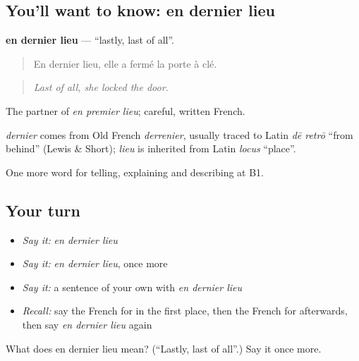 \subsection*{You'll want to know: en dernier lieu}
\textbf{en dernier lieu} — \textquotedblleft{}lastly, last of all\textquotedblright{}.

\begin{quote}
En dernier lieu, elle a fermé la porte à clé.
\end{quote}

\begin{quote}
\emph{Last of all, she locked the door.}
\end{quote}

The partner of \emph{en premier lieu}; careful, written French.

\begin{cousinweb}
\emph{dernier} comes from Old French \emph{derrenier}, usually traced to Latin \emph{dē retrō} \textquotedblleft{}from behind\textquotedblright{} (Lewis \& Short); \emph{lieu} is inherited from Latin \emph{locus} \textquotedblleft{}place\textquotedblright{}.
\end{cousinweb}

\begin{grammarlens}[title={What you've built}]
One more word for telling, explaining and describing at B1.
\end{grammarlens}

\subsection*{Your turn}
\begin{itemize}
\raggedright
  \item \emph{Say it:} \emph{en dernier lieu}
  \item \emph{Say it:} \emph{en dernier lieu}, once more
  \item \emph{Say it:} a sentence of your own with \emph{en dernier lieu}
  \item \emph{Recall:} say the French for in the first place, then the French for afterwards, then say \emph{en dernier lieu} again
\end{itemize}

\begin{tcolorbox}[breakable,colback=teal!4,colframe=teal!35!black,title={Before you move on}]
What does en dernier lieu mean? (\textquotedblleft{}Lastly, last of all\textquotedblright{}.) Say it once more.
\end{tcolorbox}
